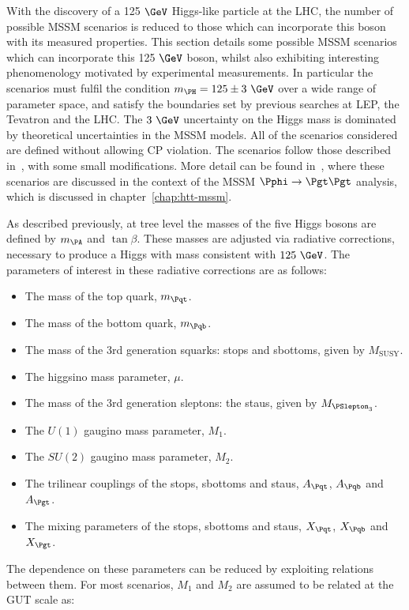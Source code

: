 With the discovery of a 125$~\GeV$ Higgs-like particle at the LHC, the number of
possible MSSM scenarios is reduced to those which can incorporate this boson
with its measured properties. This section details some possible MSSM scenarios
which can incorporate this 125$~\GeV$ boson, whilst also exhibiting interesting
phenomenology motivated by experimental measurements. In particular the
scenarios must fulfil the condition $m_{\PH} = 125 \pm 3~\GeV$ over a wide range
of parameter space, and satisfy the boundaries set by previous searches at LEP,
the Tevatron and the LHC. The $3~\GeV$ uncertainty on the Higgs mass is
dominated by theoretical uncertainties in the MSSM models. All of the scenarios 
considered are defined without allowing CP violation. The scenarios follow those
described in~\cite{MSSMScenarios}, with some small modifications. More detail
can be found in~\cite{HIG-13-021}, where these scenarios are discussed in the context
of the MSSM $\Pphi \to \Pgt\Pgt$ analysis, which is discussed in
chapter~\ref{chap:htt-mssm}. 

As described previously, at tree level the masses of the five Higgs bosons are
defined by $m_{\PA}$ and $\tan\beta$. These masses are adjusted via radiative
corrections, necessary to produce a Higgs with mass consistent with $125~\GeV$.
The parameters of interest in these radiative corrections are as follows:

\begin{itemize}
\item The mass of the top quark, $m_{\Pqt}$.
\item The mass of the bottom quark, $m_{\Pqb}$.
\item The mass of the 3rd generation squarks: stops and sbottoms, given by
$M_{\text{SUSY}}$.
\item The higgsino mass parameter, $\mu$.
\item The mass of the 3rd generation sleptons: the staus, given by
$M_{\PSlepton_{3}}$.
\item The $U(1)$ gaugino mass parameter, $M_{1}$.
\item The $SU(2)$ gaugino mass parameter, $M_{2}$.
\item The trilinear couplings of the stops, sbottoms and staus, $A_{\Pqt}$,
$A_{\Pqb}$ and $A_{\Pgt}$.
\item The mixing parameters of the stops, sbottoms and staus, $X_{\Pqt}$,
$X_{\Pqb}$ and $X_{\Pgt}$.
\end{itemize}

The dependence on these parameters can be reduced by exploiting relations
between them. For most scenarios, $M_{1}$ and $M_{2}$ are assumed to be related
at the GUT scale as:

